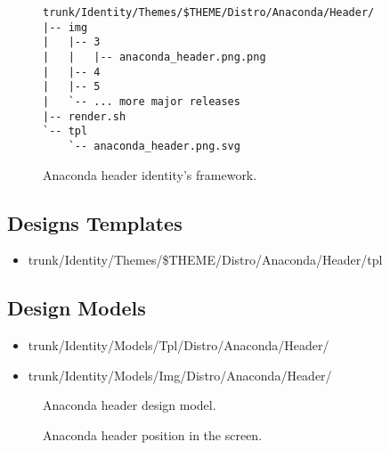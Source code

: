 
\begin{figure}[!hbp]
\hrulefill
\begin{verbatim}
trunk/Identity/Themes/$THEME/Distro/Anaconda/Header/
|-- img
|   |-- 3
|   |   |-- anaconda_header.png.png
|   |-- 4
|   |-- 5
|   `-- ... more major releases
|-- render.sh
`-- tpl
    `-- anaconda_header.png.svg
\end{verbatim}
\hrulefill
\caption{Anaconda header identity's framework.%
   \label{fig:Distribution:Anaconda:Header:Identity}}
\end{figure}

\subsection{Designs Templates}
\hypertarget{sec:Distribution:Anaconda:Header:Identity:Templates}{}
\label{sec:Distribution:Anaconda:Header:Identity:Templates}

\begin{itemize}
\item trunk/Identity/Themes/\$THEME/Distro/Anaconda/Header/tpl
\end{itemize}

\subsection{Design Models}

\begin{itemize}
\item trunk/Identity/Models/Tpl/Distro/Anaconda/Header/
\item trunk/Identity/Models/Img/Distro/Anaconda/Header/
\end{itemize}

\begin{figure}[!hbp]
\begin{center}
\end{center}
\caption{Anaconda header design model.%
   \label{fig:Distribution:Anaconda:Header:Models:Fig1}}
\end{figure}

\begin{figure}[!hbp]
\begin{center}
\end{center}
\caption{Anaconda header position in the screen.%
   \label{fig:Distribution:Anaconda:Header:Models:Fig2}}
\end{figure}

